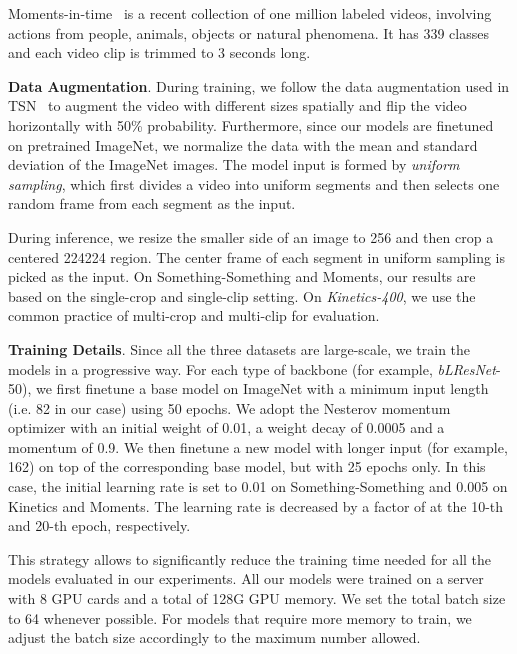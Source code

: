 \documentclass{article}
\def\blresnet{\textit{bLResNet}\xspace}
\def\K400{\textit{Kinetics-400}\xspace}
\begin{document}
Moments-in-time~\cite{Moments:monfort2019moments} is a recent collection of one million labeled videos, involving actions from people, animals, objects or natural phenomena. It has 339 classes and each video clip is trimmed to 3 seconds long.

\textbf{Data Augmentation}. 
During training, we follow the data augmentation used in TSN~\cite{TSN:wang2016temporal} to augment the video with different sizes spatially and flip the video horizontally with 50\% probability. Furthermore, since our models are finetuned on pretrained ImageNet, we normalize the data with the mean and standard deviation of the ImageNet images. The model input is formed by \textit{uniform sampling}, which first divides a video into  uniform segments and then selects one random frame from each segment as the input.

During inference, we resize the smaller side of an image to 256 and then crop a centered 224224 region.  The center frame of each segment in uniform sampling is picked as the input. On Something-Something and Moments, our results are based on the single-crop and single-clip setting. On \K400, we use the common practice of multi-crop and multi-clip for evaluation.

\textbf{Training Details}.
Since all the three datasets are large-scale, we train the models in a progressive way.
For each type of backbone (for example, \blresnet-50), we first finetune a base model on ImageNet with a minimum input length (i.e. 82 in our case) using 50 epochs. We adopt the Nesterov momentum optimizer with an initial weight of 0.01, a weight decay of 0.0005 and a momentum of 0.9. We then finetune a new model with longer input (for example, 162) on top of the corresponding base model, but with 25 epochs only. In this case, the initial learning rate is set to 0.01 on Something-Something and 0.005 on Kinetics and Moments. The learning rate is decreased by a factor of  at the 10-th and 20-th epoch, respectively.

This strategy allows to significantly reduce the training time needed for all the models evaluated in our experiments. All our models were trained on a server with 8 GPU cards and a total of 128G GPU memory. We set the total batch size to 64 whenever possible. For models that require more memory to train, we adjust the batch size accordingly to the maximum number allowed. 
\end{document}
